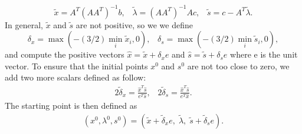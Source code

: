 \documentclass[a4paper,10 pt,titlepage,twoside]{book}
\theoremstyle{plain}
\theoremstyle{definition}
\theoremstyle{remark}
\begin{document}
\begin{equation}\label{71}
\tilde{x} = A^{T}(AA^{T})^{-1}b,\;\;\;\tilde{\lambda}=(AA^{T})^{-1}Ac,\;\;\; \tilde{s} = c- A^{T}\tilde{\lambda}.
\end{equation}
In general, $\tilde{x}$ and $\tilde{s}$ are not positive, so we we define
\begin{equation*}
\delta_{x} = \max(-(3/2)\min\limits_{i}\tilde{x}_{i},0),\;\;\; \delta_{s} = \max(-(3/2)\min\limits_{i}\tilde{s}_{i},0),
\end{equation*}
and compute the positive vectors $\hat{x}= \tilde{x}+\delta_{x}e$ and $\hat{s}= \tilde{s}+\delta_{s}e$ where e is the unit vector. To ensure that the initial points $x^{0}$ and $s^{0}$ are not too close to zero, we add two more scalars defined as follow:
\begin{align}\label{72}
2\tilde{\delta}_{x}= \frac{\hat{x}^{T}\hat{s}}{e^{T}\hat{s}},\;\;\;2\tilde{\delta}_{s} = \frac{\hat{x}^{T}\hat{s}}{e^{T}\hat{x}}.
\end{align}
The starting point is then defined as 
\begin{align*}
(x^{0}, \lambda^{0}, s^{0}) = (\tilde{x}+\tilde{\delta}_{x} e,\;\tilde{\lambda},\;\tilde{s}+\tilde{\delta}_{s} e).
\end{align*}
\\
\end{document}
